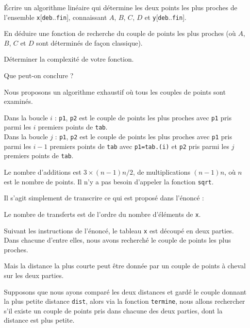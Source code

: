 Écrire un algorithme linéaire qui détermine les deux points les plus proches de l'ensemble \texttt{x}[\texttt{deb}..\texttt{fin}], connaissant $A$, $B$, $C$, $D$ et \texttt{y}[\texttt{deb}..\texttt{fin}].
\medskip

En déduire une fonction de recherche du couple de points les plus proches (où $A$, $B$, $C$ et $D$ sont déterminés de façon classique).
\medskip

Déterminer la complexité de votre fonction.
\medskip

Que peut-on conclure ?

\Corrige

\Q
Nous proposons un algorithme exhaustif où tous les couples de points sont examinés.



Dans la boucle $i$ : \texttt{p1}, \texttt{p2} est le couple de points les plus proches avec \texttt{p1} pris parmi les $i$ premiers points de \texttt{tab}.\\
Dans la boucle $j$ : \texttt{p1}, \texttt{p2} est le couple de points les plus proches avec \texttt{p1} pris parmi les $i-1$ premiers points de \texttt{tab} avec \texttt{p1=tab.(i)} et \texttt{p2} pris parmi les $j$ premiers points de \texttt{tab}.
\medskip

Le nombre d'additions est $3 \times (n-1)n/2$, de multiplications $(n-1)n$, où $n$ est le nombre de points. Il n'y a pas besoin d'appeler la fonction \texttt{sqrt}.

\Q
Il s'agit simplement de transcrire ce qui est proposé dans l'énoncé :



Le nombre de transferts est de l'ordre du nombre d'éléments de \texttt{x}.

\Q
Suivant les instructions de l'énoncé, le tableau \texttt{x} est découpé en deux parties. Dans chacune d'entre elles, nous avons recherché le couple de points les plus proches.
\medskip

Mais la distance la plus courte peut être donnée par un couple de points à cheval sur les deux parties.
\medskip

Supposons que nous ayons comparé les deux distances et gardé le couple donnant la plus petite distance \texttt{dist}, alors via la fonction \texttt{termine}, nous allons rechercher s'il existe un couple de points pris dans chacune des deux parties, dont la distance est plus petite.
\medskip

